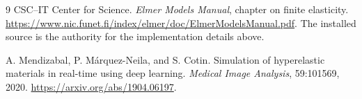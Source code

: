 \documentclass[11pt]{article}
\begin{document}
\begin{thebibliography}{9}
CSC--IT Center for Science. \emph{Elmer Models Manual}, chapter on finite elasticity.
\url{https://www.nic.funet.fi/index/elmer/doc/ElmerModelsManual.pdf}.
The installed source is the authority for the implementation details above.

A. Mendizabal, P. M\'arquez-Neila, and S. Cotin.
Simulation of hyperelastic materials in real-time using deep learning.
\emph{Medical Image Analysis}, 59:101569, 2020.
\url{https://arxiv.org/abs/1904.06197}.
\end{thebibliography}
\end{document}
